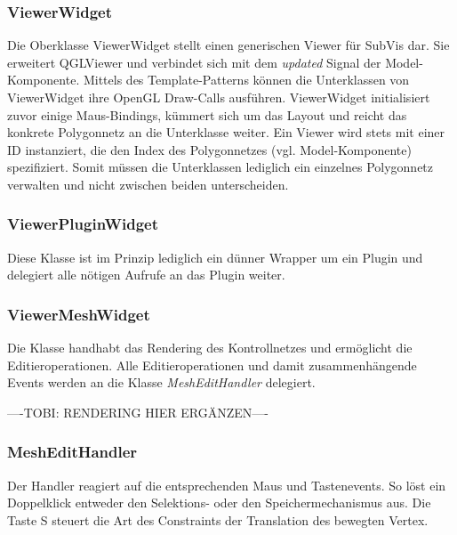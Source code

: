\subsubsection{ViewerWidget}

Die Oberklasse ViewerWidget stellt einen generischen Viewer für SubVis dar.
Sie erweitert QGLViewer und verbindet sich mit dem \emph{updated} Signal der Model-Komponente.
Mittels des Template-Patterns können die Unterklassen von ViewerWidget ihre OpenGL Draw-Calls ausführen.
ViewerWidget initialisiert zuvor einige Maus-Bindings, kümmert sich um das Layout und reicht das konkrete Polygonnetz an die Unterklasse weiter.
Ein Viewer wird stets mit einer ID instanziert, die den Index des Polygonnetzes (vgl. Model-Komponente) spezifiziert.
Somit müssen die Unterklassen lediglich ein einzelnes Polygonnetz verwalten und nicht zwischen beiden unterscheiden.

\subsubsection{ViewerPluginWidget}

Diese Klasse ist im Prinzip lediglich ein dünner Wrapper um ein Plugin und delegiert alle nötigen Aufrufe an das Plugin weiter.

\subsubsection{ViewerMeshWidget}

Die Klasse handhabt das Rendering des Kontrollnetzes und ermöglicht die Editieroperationen.
Alle Editieroperationen und damit zusammenhängende Events werden an die Klasse \emph{MeshEditHandler} delegiert.


----TOBI: RENDERING HIER ERGÄNZEN----


\subsubsection{MeshEditHandler}

Der Handler reagiert auf die entsprechenden Maus und Tastenevents.
So löst ein Doppelklick entweder den Selektions- oder den Speichermechanismus aus.
Die Taste S steuert die Art des Constraints der Translation des bewegten Vertex.

